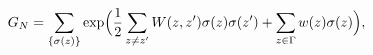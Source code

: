 \begin{equation}\label{G}
G_N=\sum_{\{\sigma(z)\}}\exp\Bigl(\frac{1}{2}
\sum_{z\neq z^\prime}W(z,z^\prime)\sigma(z)\sigma(z^\prime)
+\sum_{z\in \Gamma}w(z)\sigma(z)\Bigr),
\end{equation}

